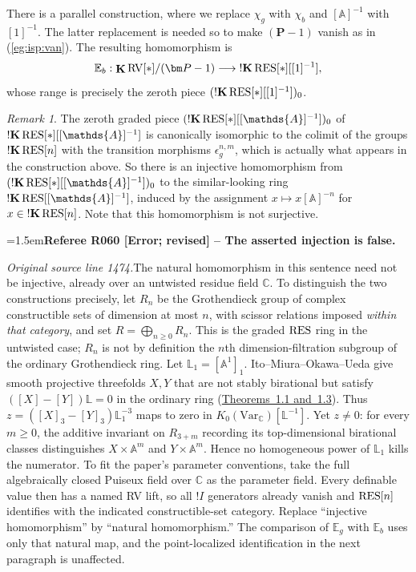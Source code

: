 \documentclass[12pt]{amsart}
\newcommand{\RefereeRemark}[4]{%
  \par\medskip\begingroup\normalfont\small\color{RefereePurple}%
  \emergencystretch=1.5em\noindent\textbf{Referee R#1 [#2] -- #3.}\par\nobreak\noindent #4\par
  \endgroup\medskip
}
\theoremstyle{plain}
\theoremstyle{definition}
\theoremstyle{remark}
\newtheorem{rem}[thm]{Remark}
\numberwithin{equation}{section}
\theoremstyle{plain}
\newcommand{\RV}{\textup{RV}}
\newcommand{\A}{\mathds{A}}
\newcommand{\0}{\emptyset}
\newcommand{\bb}[1]{\mathbb{#1}}
\newcommand{\fun}{\longrightarrow}
\newcommand{\efun}{\longmapsto}
\newcommand{\RES}{\textup{RES}}
\DeclareMathOperator{\ggk}{\mathbf{K}}
\DeclareMathOperator{\sggk}{!\mathbf{K}}
\begin{document}
There is a parallel construction, where  we replace $\chi_g$ with $\chi_b$ and $[\A]^{-1}$ with $[1]^{-1}$. The latter replacement is needed so to make $(\bm P - 1)$ vanish as in (\ref{eg:isp:van}). The resulting homomorphism is
\begin{equation}\label{EB}
\bb E_b : \ggk \RV[*] / (\bm P - 1) \fun \sggk \RES[*][[1]^{-1}],
\end{equation}
whose range is precisely the zeroth piece  $(\sggk \RES[*][[1]^{-1}])_0$.

\begin{rem}\label{eb:no:eg}
The zeroth graded piece $(\sggk \RES[*][[\A]^{-1}])_0$ of $\sggk \RES[*][[\A]^{-1}]$ is canonically isomorphic to the colimit  of the groups $\sggk \RES[n]$ with the transition morphisms $\epsilon^{n,m}_g $, which is actually what appears in the construction above. So there is an injective homomorphism from $(\sggk \RES[*][[\A]^{-1}])_0$ to the similar-looking ring $\sggk \RES[[\A]^{-1}]$, induced by the assignment $x \efun x[\A]^{-n}$ for $x \in \sggk \RES[n]$. Note that this homomorphism is not surjective.

\RefereeRemark{060}{Error; revised}{The asserted injection is false}{%
\textit{Original source line 1474.}\quad The natural homomorphism in this sentence need not be injective, already over an untwisted residue field $\mathbb C$. To distinguish the two constructions precisely, let $R_n$ be the Grothendieck group of complex constructible sets of dimension at most $n$, with scissor relations imposed \emph{within that category}, and set $R=\bigoplus_{n\geq0}R_n$. This is the graded $\RES$ ring in the untwisted case; $R_n$ is not by definition the $n$th dimension-filtration subgroup of the ordinary Grothendieck ring. Let $\mathbb L_1=[\mathbb A^1]_1$. Ito--Miura--Okawa--Ueda give smooth projective threefolds $X,Y$ that are not stably birational but satisfy $([X]-[Y])\mathbb L=0$ in the ordinary ring (\href{https://arxiv.org/pdf/1606.04210}{Theorems~1.1 and~1.3}). Thus $z=([X]_3-[Y]_3)\mathbb L_1^{-3}$ maps to zero in $K_0(\mathrm{Var}_{\mathbb C})[\mathbb L^{-1}]$. Yet $z\neq0$: for every $m\geq0$, the additive invariant on $R_{3+m}$ recording its top-dimensional birational classes distinguishes $X\times\mathbb A^m$ and $Y\times\mathbb A^m$. Hence no homogeneous power of $\mathbb L_1$ kills the numerator. To fit the paper's parameter conventions, take the full algebraically closed Puiseux field over $\mathbb C$ as the parameter field. Every definable value then has a named RV lift, so all $!I$ generators already vanish and $\RES[n]$ identifies with the indicated constructible-set category. Replace ``injective homomorphism'' by ``natural homomorphism.'' The comparison of $\mathbb E_g$ with $\mathbb E_b$ uses only that natural map, and the point-localized identification in the next paragraph is unaffected.
}


\end{rem}
\end{document}
